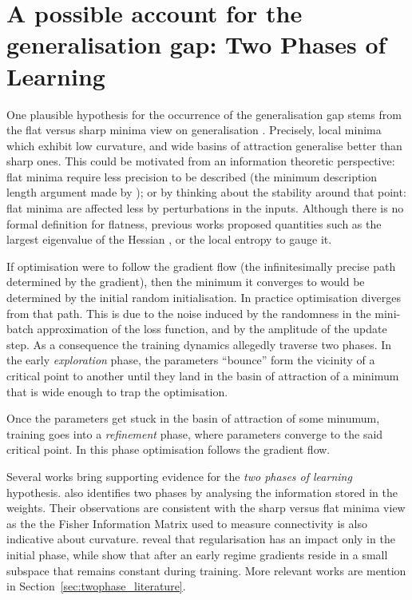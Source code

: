 \section{A possible account for the generalisation gap: Two Phases of Learning}
\label{sec:two_phases}

One plausible hypothesis for the occurrence of the generalisation gap stems from the flat versus sharp minima view on generalisation \cite{hochreiter1997flat}. Precisely, local minima which exhibit low curvature, and wide basins of attraction generalise better than sharp ones. This could be motivated from an information theoretic perspective: flat minima require less precision to be described (the minimum description length argument made by \cite{hochreiter1997flat}); or by thinking about the stability around that point: flat minima are affected less by perturbations in the inputs. Although there is no formal definition for flatness, previous works proposed quantities such as the largest eigenvalue of the Hessian \cite{keskar2017on}, or the local entropy \cite{chaudhari2019entropy} to gauge it. 

If optimisation were to follow the gradient flow (the infinitesimally precise path determined by the gradient), then the minimum it converges to would be determined by the initial random initialisation. In practice optimisation diverges from that path. This is due to the noise induced by the randomness in the mini-batch approximation of the loss function, and by the amplitude of the update step. As a consequence the training dynamics allegedly traverse two phases.
In the early \textit{exploration} phase, the parameters ``bounce'' form the vicinity of a critical point to another until they land in the basin of attraction of a minimum that is wide enough to trap the optimisation.

Once the parameters get stuck in the basin of attraction of some minumum, training goes into a \textit{refinement} phase,  where parameters converge to the said critical point. In this phase optimisation follows the gradient flow. 

Several works bring supporting evidence for the \emph{two phases of learning} hypothesis. \cite{achille2018critical} also identifies two phases by analysing the information stored in the weights. Their observations are consistent with the sharp versus flat minima view as the the Fisher Information Matrix used to measure connectivity is also indicative about curvature. \cite{golatkar2019time} reveal that regularisation has an impact only in the initial phase, while \cite{gur2018gradient} show that after an early regime gradients reside in a small subspace that remains constant during training. More relevant works are mention in Section~\ref{sec:twophase_literature}.

